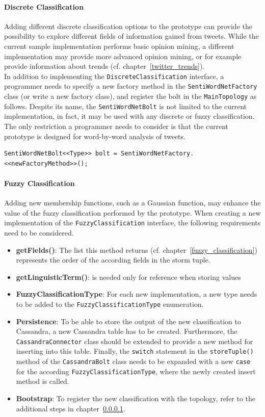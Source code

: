 \documentclass[a4paper]{article}
\begin{document}
\paragraph{Discrete Classification}\label{discrete_extension}
Adding different discrete classification options to the prototype can provide the possibility to explore different fields of information gained from tweets. While the current sample implementation performs basic opinion mining, a different implementation may provide more advanced opinion mining, or for example provide information about trends (cf. chapter~\ref{twitter_trends}).\\
In addition to implementing the \texttt{DiscreteClassification} interface, a programmer needs to specify a new factory method in the \texttt{SentiWordNetFactory} class (or write a new factory class), and register the bolt in the \texttt{MainTopology} as follows. Despite its name, the \texttt{SentiWordNetBolt} is not limited to the current implementation, in fact, it may be used with any discrete or fuzzy classification. The only restriction a programmer needs to consider is that the current prototype is designed for word-by-word analysis of tweets.
\begin{lstlisting}
SentiWordNetBolt<<Type>> bolt = SentiWordNetFactory.<<newFactoryMethod>>();
\end{lstlisting}
\paragraph{Fuzzy Classification}
Adding new membership functions, such as a Gaussian function, may enhance the value of the fuzzy classification performed by the prototype. When creating a new implementation of the \texttt{FuzzyClassification} interface, the following requirements need to be considered.
\begin{itemize}
\item \textbf{getFields()}: The list this method returns (cf. chapter~\ref{fuzzy_classification}) represents the order of the according fields in the storm tuple.
\item \textbf{getLinguisticTerm()}: is needed only for reference when storing values
\item \textbf{FuzzyClassificationType}: For each new implementation, a new type needs to be added to the \texttt{FuzzyClassificationType} enumeration.
\item \textbf{Persistence}: To be able to store the output of the new classification to Cassandra, a new Cassandra table has to be created. Furthermore, the \texttt{CassandraConnector} class should be extended to provide a new method for inserting into this table. Finally, the \texttt{switch} statement in the \texttt{storeTuple()} method of the \texttt{CassandraBolt} class needs to be expanded with a new \texttt{case} for the according \texttt{FuzzyClassificationType}, where the newly created insert method is called.
\item \textbf{Bootstrap}: To register the new classification with the topology, refer to the additional steps in chapter~\ref{discrete_extension}.
\end{itemize}
\end{document}
